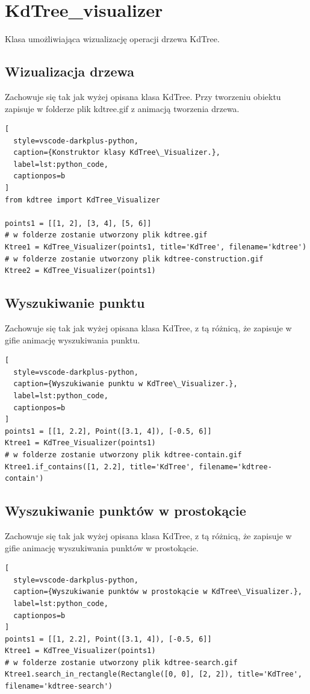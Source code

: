 \documentclass{lab}
\begin{document}
\section{KdTree\_visualizer}
Klasa umożliwiająca wizualizację operacji drzewa KdTree.
\subsection{Wizualizacja drzewa}
Zachowuje się tak jak wyżej opisana klasa KdTree. Przy tworzeniu obiektu zapisuje w folderze plik kdtree.gif z animacją tworzenia drzewa.
\begin{lstlisting}[
  style=vscode-darkplus-python,
  caption={Konstruktor klasy KdTree\_Visualizer.},
  label=lst:python_code,
  captionpos=b
]
from kdtree import KdTree_Visualizer

points1 = [[1, 2], [3, 4], [5, 6]]
# w folderze zostanie utworzony plik kdtree.gif
Ktree1 = KdTree_Visualizer(points1, title='KdTree', filename='kdtree')
# w folderze zostanie utworzony plik kdtree-construction.gif
Ktree2 = KdTree_Visualizer(points1)
\end{lstlisting}

\subsection{Wyszukiwanie punktu}
Zachowuje się tak jak wyżej opisana klasa KdTree, z tą różnicą, że zapisuje w gifie animację wyszukiwania punktu.
\begin{lstlisting}[
  style=vscode-darkplus-python,
  caption={Wyszukiwanie punktu w KdTree\_Visualizer.},
  label=lst:python_code,
  captionpos=b
]
points1 = [[1, 2.2], Point([3.1, 4]), [-0.5, 6]]
Ktree1 = KdTree_Visualizer(points1)
# w folderze zostanie utworzony plik kdtree-contain.gif
Ktree1.if_contains([1, 2.2], title='KdTree', filename='kdtree-contain')
\end{lstlisting}

\subsection{Wyszukiwanie punktów w prostokącie}
Zachowuje się tak jak wyżej opisana klasa KdTree, z tą różnicą, że zapisuje w gifie animację wyszukiwania punktów w prostokącie.
\begin{lstlisting}[
  style=vscode-darkplus-python,
  caption={Wyszukiwanie punktów w prostokącie w KdTree\_Visualizer.},
  label=lst:python_code,
  captionpos=b
]
points1 = [[1, 2.2], Point([3.1, 4]), [-0.5, 6]]
Ktree1 = KdTree_Visualizer(points1)
# w folderze zostanie utworzony plik kdtree-search.gif
Ktree1.search_in_rectangle(Rectangle([0, 0], [2, 2]), title='KdTree', filename='kdtree-search')
\end{lstlisting}
\end{document}
